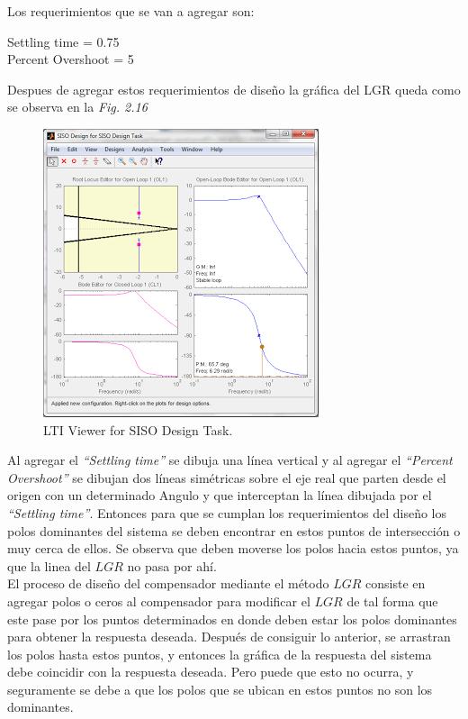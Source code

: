 \documentclass[a4paper,12pt,twoside]{proyectotanquesecci}
\begin{document}
Los requerimientos que se van a agregar son:

\begin{center}
Settling time = 0.75 \\
Percent Overshoot = 5 \\
\end{center}

Despues de agregar estos requerimientos de diseño la gráfica del LGR queda como se observa en la \textit{Fig. 2.16} \\

\begin{figure}[h]
\centering
\includegraphics[scale=0.6]{Ventana10}
\renewcommand{\figurename}{Fig.}
\caption{LTI Viewer for SISO Design Task.}
\label{LTI Viewer for SISO Design Task.}
\end{figure}

Al agregar el \textit{“Settling time”} se dibuja una línea vertical  y al agregar el \textit{“Percent Overshoot”} se dibujan dos líneas simétricas sobre el eje real que parten desde el origen con un determinado Angulo y que interceptan la línea dibujada por el \textit{“Settling time”}. Entonces para que se cumplan los requerimientos del diseño los polos dominantes del sistema se deben encontrar en estos puntos de intersección o muy cerca de ellos. Se observa que deben moverse los polos hacia estos puntos, ya que la linea del $LGR$ no pasa por ahí. \\

El proceso de diseño del compensador mediante el método $LGR$ consiste en agregar polos o ceros al compensador para modificar el $LGR$ de tal forma que este pase por los puntos determinados en donde deben estar los polos dominantes para obtener la respuesta deseada. Después de consiguir lo anterior, se arrastran los polos  hasta estos puntos, y entonces la gráfica de la respuesta del sistema debe coincidir con la respuesta deseada. Pero puede que esto no ocurra, y seguramente se debe a que los polos que se ubican en estos puntos no son los dominantes. \\
\end{document}
